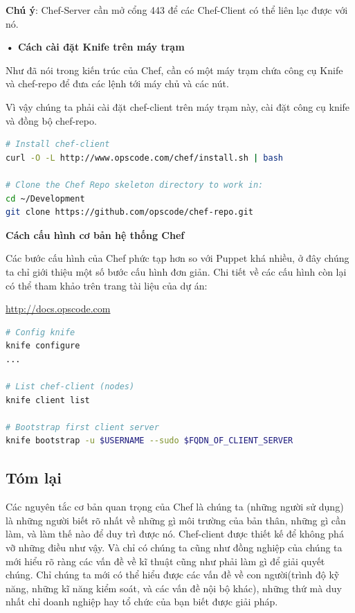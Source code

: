 \textbf{Chú ý}: Chef-Server cần mở cổng 443 để các Chef-Client có thể liên lạc được với nó.

\textbf{• Cách cài đặt Knife trên máy trạm}

Như đã nói trong kiến trúc của Chef, cần có một máy trạm chứa công cụ Knife và chef-repo để đưa các lệnh tới máy chủ và các nút.

Vì vậy chúng ta phải cài đặt chef-client trên máy trạm này, cài đặt công cụ knife và đồng bộ chef-repo.

\begin{lstlisting}[label={lst:chef_install_knife},caption={Cách cài đặt knife và chef-repo},language=bash]
# Install chef-client
curl -O -L http://www.opscode.com/chef/install.sh | bash

# Clone the Chef Repo skeleton directory to work in:
cd ~/Development
git clone https://github.com/opscode/chef-repo.git
\end{lstlisting}

\newpage
\clearpage

\textbf{\large Cách cấu hình cơ bản hệ thống Chef}

Các bước cấu hình của Chef phức tạp hơn so với Puppet khá nhiều, ở đây chúng ta chỉ giới thiệu một số bước cấu hình đơn giản. Chi tiết về các cấu hình còn lại có thể tham khảo trên trang tài liệu của dự án: 

\url{http://docs.opscode.com}

\begin{lstlisting}[label={lst:chef_basic_config},caption={Các bước cấu hình hệ thống Chef},language=bash]
# Config knife
knife configure
...

# List chef-client (nodes)
knife client list

# Bootstrap first client server
knife bootstrap -u $USERNAME --sudo $FQDN_OF_CLIENT_SERVER
\end{lstlisting}

\newpage
\clearpage

\subsection*{Tóm lại}

Các nguyên tắc cơ bản quan trọng của Chef là chúng ta (những người sử dụng) là những người biết rõ nhất về những gì môi trường của bản thân, những gì cần làm, và làm thế nào để duy trì được nó. Chef-client được thiết kế để không phá vỡ những điều như vậy. Và chỉ có chúng ta cũng như đồng nghiệp của chúng ta mới hiểu rõ ràng các vấn đề về kĩ thuật cũng như phải làm gì để giải quyết chúng. Chỉ chúng ta mới có thể hiểu được các vấn đề về con người(trình độ kỹ năng, những kĩ năng kiểm soát, và các vấn đề nội bộ khác), những thứ mà duy nhất chỉ doanh nghiệp hay tổ chức của bạn biết được giải pháp.

